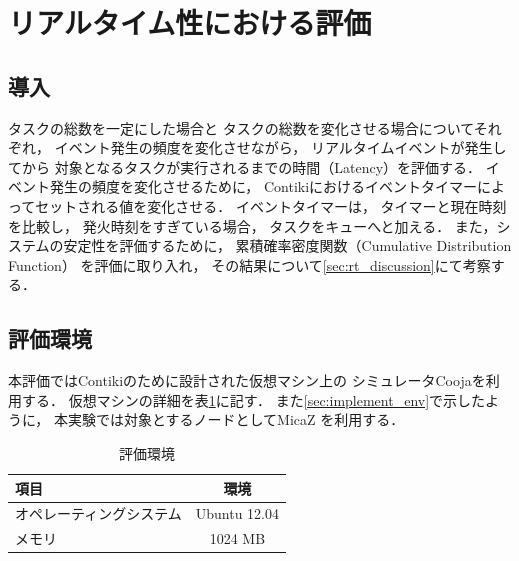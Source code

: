 \section{リアルタイム性における評価}
\subsection{導入}
タスクの総数を一定にした場合と
タスクの総数を変化させる場合についてそれぞれ，
イベント発生の頻度を変化させながら，
リアルタイムイベントが発生してから
対象となるタスクが実行されるまでの時間（Latency）を評価する．
イベント発生の頻度を変化させるために，
Contikiにおけるイベントタイマーによってセットされる値を変化させる．
イベントタイマーは，
タイマーと現在時刻を比較し，
発火時刻をすぎている場合，
タスクをキューへと加える．
また，システムの安定性を評価するために，
累積確率密度関数（Cumulative Distribution Function）
を評価に取り入れ，
その結果について\ref{sec:rt_discussion}にて考察する．



\subsection{評価環境}
本評価ではContikiのために設計された仮想マシン上の
シミュレータCooja\cite{osterlind2006cross}を利用する．
仮想マシンの詳細を表\ref{tab:instant_contiki}に記す．
また\ref{sec:implement_env}で示したように，
本実験では対象とするノードとしてMicaZ\cite{Hill:2002:MWP:623308.624560}
を利用する．

\begin{table}[htbp]
  \centering
  \caption{評価環境}
  \begin{tabular}{|l||c|} \hline
  	項目	 & 環境 \\ \hline \hline
	オペレーティングシステム & Ubuntu 12.04 \\ \hline
	メモリ & 1024 MB \\ \hline
  \end{tabular}
  \label{tab:instant_contiki}
\end{table}


